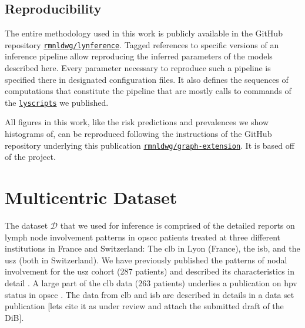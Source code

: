 \documentclass[twocolumn]{aastex631}
\begin{document}
\subsection{Reproducibility}
\label{subsec:complete_model:reproducibility}

The entire methodology used in this work is publicly available in the GitHub repository \href{https://github.com/rmnldwg/lynference}{\texttt{rmnldwg/lynference}}. Tagged references to specific versions of an inference pipeline allow reproducing the inferred parameters of the models described here. Every parameter necessary to reproduce such a pipeline is specified there in designated configuration files. It also defines the sequences of computations that constitute the pipeline that are mostly calls to commands of the \href{https://pypi.org/project/lyscripts/}{\texttt{lyscripts}} we published.

All figures in this work, like the risk predictions and prevalences we show histograms of, can be reproduced following the instructions of the GitHub repository underlying this publication \href{\GitHubURL}{\texttt{rmnldwg/graph-extension}}. It is based off of the \showyourwork project.



\section{Multicentric Dataset}
\label{sec:data}

\begin{table}
    \centering
    \caption{Prevalence of involvement patterns in the multi-centric dataset. An involvement pattern is characterized by the state of the six \glspl{lnl}: A red dot means the \gls{lnl} was reported to be metastatic, a green dot means it was determined to be healthy and a question mark means that the prevalence was marginalized over the state of this \gls{lnl}.}
    \label{table:data_prevalence}
\end{table}

The dataset $\boldsymbol{\mathcal{D}}$ that we used for inference is comprised of the detailed reports on lymph node involvement patterns in \gls{opscc} patients treated at three different institutions in France and Switzerland: The \gls{clb} in Lyon (France), the \gls{isb}, and the \gls{usz} (both in Switzerland). We have previously published the patterns of nodal involvement for the \gls{usz} cohort (287 patients) \cite{ludwig_dataset_2022} and described its characteristics in detail \cite{ludwig_detailed_2022}. A large part of the \gls{clb} data (263 patients) underlies a publication on \gls{hpv} status in \gls{opscc} \cite{bauwens_prevalence_2021}. The data from \gls{clb} and \gls{isb} are described in details in a data set publication [lets cite it as under review and attach the submitted draft of the DiB].
\end{document}
